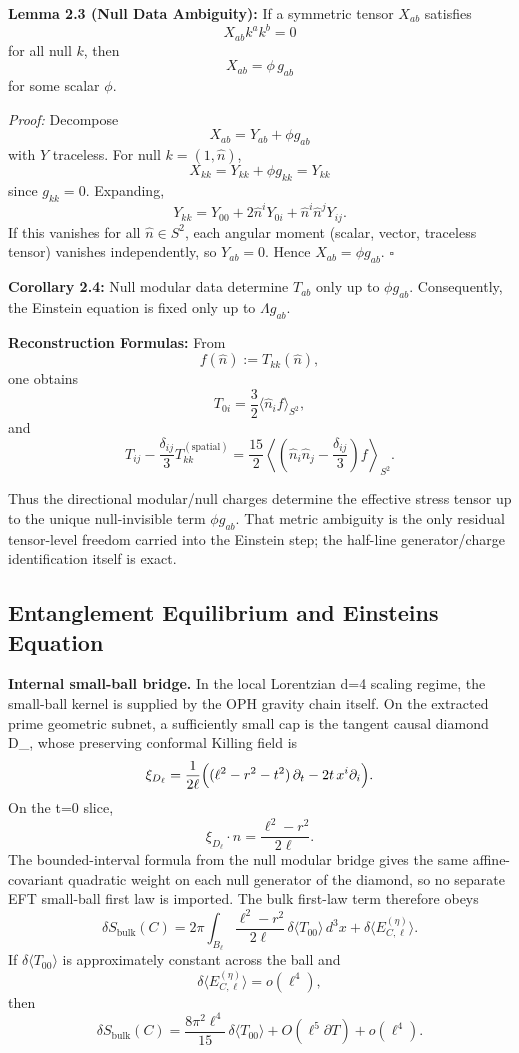 \textbf{Lemma 2.3 (Null Data Ambiguity):} If a symmetric tensor \(X_{ab}\) satisfies
\[
X_{ab}k^a k^b = 0
\]
for all null \(k\), then
\[
X_{ab} = \phi\, g_{ab}
\]
for some scalar \(\phi\).

\emph{Proof:} Decompose
\[
X_{ab}=Y_{ab}+\phi g_{ab}
\]
with \(Y\) traceless. For null \(k=(1,\hat n)\),
\[
X_{kk}=Y_{kk}+\phi g_{kk}=Y_{kk}
\]
since \(g_{kk}=0\). Expanding,
\[
Y_{kk}=Y_{00}+2\hat n^iY_{0i}+\hat n^i\hat n^jY_{ij}.
\]
If this vanishes for all \(\hat n\in S^2\), each angular moment (scalar, vector, traceless tensor) vanishes independently, so \(Y_{ab}=0\). Hence \(X_{ab}=\phi g_{ab}\). \(\square\)

\textbf{Corollary 2.4:} Null modular data determine \(T_{ab}\) only up to \(\phi g_{ab}\). Consequently, the Einstein equation is fixed only up to \(\Lambda g_{ab}\).

\textbf{Reconstruction Formulas:} From
\[
f(\hat n):=T_{kk}(\hat n),
\]
one obtains
\[
T_{0i}=\frac{3}{2}\langle \hat n_i f\rangle_{S^2},
\]
and
\[
T_{ij}-\frac{\delta_{ij}}{3}T^{(\mathrm{spatial})}_{kk}
=
\frac{15}{2}
\left\langle
\left(
\hat n_i\hat n_j-\frac{\delta_{ij}}{3}
\right)f
\right\rangle_{S^2}.
\]

Thus the directional modular/null charges determine the effective stress tensor up to the unique null-invisible term \(\phi g_{ab}\). That metric ambiguity is the only residual tensor-level freedom carried into the Einstein step; the half-line generator/charge identification itself is exact.

\subsection{Entanglement Equilibrium and Einstein\textquotesingle s Equation}\label{25-entanglement-equilibrium-and-einsteins-equation}

\textbf{Internal small-ball bridge.} In the local Lorentzian d=4 scaling regime, the small-ball kernel is supplied by the OPH gravity chain itself. On the extracted prime geometric subnet, a sufficiently small cap is the tangent causal diamond D_\ell, whose preserving conformal Killing field is
\[
\xi_{D_\ell}
=
\frac{1}{2\ell}
\Bigl((\ell^2-r^2-t^2)\,\partial_t-2t\,x^i\partial_i\Bigr).
\]
On the t=0 slice,
\[
\xi_{D_\ell}\!\cdot n=\frac{\ell^2-r^2}{2\ell}.
\]
The bounded-interval formula from the null modular bridge gives the same affine-covariant quadratic weight on each null generator of the diamond, so no separate EFT small-ball first law is imported. The bulk first-law term therefore obeys
\[
\delta S_{\mathrm{bulk}}(C)
=
2\pi\int_{B_\ell}\frac{\ell^2-r^2}{2\ell}\,\delta\langle T_{00}\rangle\,d^3x
+
\delta\langle E^{(\eta)}_{C,\ell}\rangle.
\]
If \(\delta\langle T_{00}\rangle\) is approximately constant across the ball and
\[
\delta\langle E^{(\eta)}_{C,\ell}\rangle=o(\ell^4),
\]
then
\[
\delta S_{\mathrm{bulk}}(C)
=
\frac{8\pi^2\ell^4}{15}\,\delta\langle T_{00}\rangle
+O(\ell^5\partial T)+o(\ell^4).
\]

